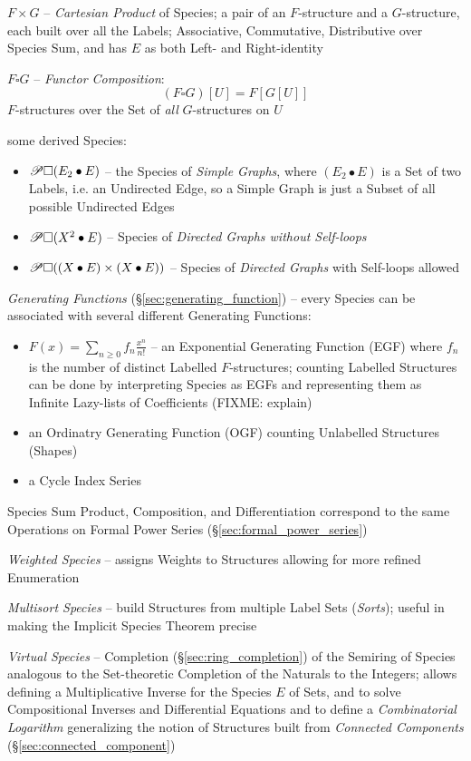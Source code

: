 $F \times G$ -- \emph{Cartesian Product} of Species; a pair of an $F$-structure
and a $G$-structure, each built over all the Labels; Associative, Commutative,
Distributive over Species Sum, and has $E$ as both Left- and Right-identity

$F \square G$ -- \emph{Functor Composition}:
\[
  (F \square G)[U] = F[G[U]]
\]
$F$-structures over the Set of \emph{all} $G$-structures on $U$

some derived Species:
\begin{itemize}
  \item $\mathscr{P} \square (E_2 \bullet E)$ -- the Species of \emph{Simple Graphs},
    where $(E_2 \bullet E)$ is a Set of two Labels, i.e. an Undirected Edge, so
    a Simple Graph is just a Subset of all possible Undirected Edges
  \item $\mathscr{P} \square (X^2 \bullet E)$ -- Species of \emph{Directed Graphs
    without Self-loops}
  \item $\mathscr{P} \square ((X \bullet E) \times (X \bullet E))$ -- Species of
    \emph{Directed Graphs} with Self-loops allowed
\end{itemize}

\emph{Generating Functions} (\S\ref{sec:generating_function}) -- every Species
can be associated with several different Generating Functions:
\begin{itemize}
  \item $F(x) = \sum_{n \geq 0}f_n\frac{x^n}{n!}$ -- an Exponential Generating
    Function (EGF) where $f_n$ is the number of distinct Labelled
    $F$-structures; counting Labelled Structures can be done by interpreting
    Species as EGFs and representing them as Infinite Lazy-lists of Coefficients
    (FIXME: explain)
  \item an Ordinatry Generating Function (OGF) counting Unlabelled Structures
    (Shapes)
  \item a Cycle Index Series
\end{itemize}

Species Sum Product, Composition, and Differentiation correspond to the same
Operations on Formal Power Series (\S\ref{sec:formal_power_series})

\emph{Weighted Species} -- assigns Weights to Structures allowing for more
refined Enumeration

\emph{Multisort Species} -- build Structures from multiple Label Sets
(\emph{Sorts}); useful in making the Implicit Species Theorem precise

\emph{Virtual Species} -- Completion (\S\ref{sec:ring_completion}) of the
Semiring of Species analogous to the Set-theoretic Completion of the Naturals to
the Integers; allows defining a Multiplicative Inverse for the Species $E$ of
Sets, and to solve Compositional Inverses and Differential Equations and to
define a \emph{Combinatorial Logarithm} generalizing the notion of Structures
built from \emph{Connected Components} (\S\ref{sec:connected_component})

